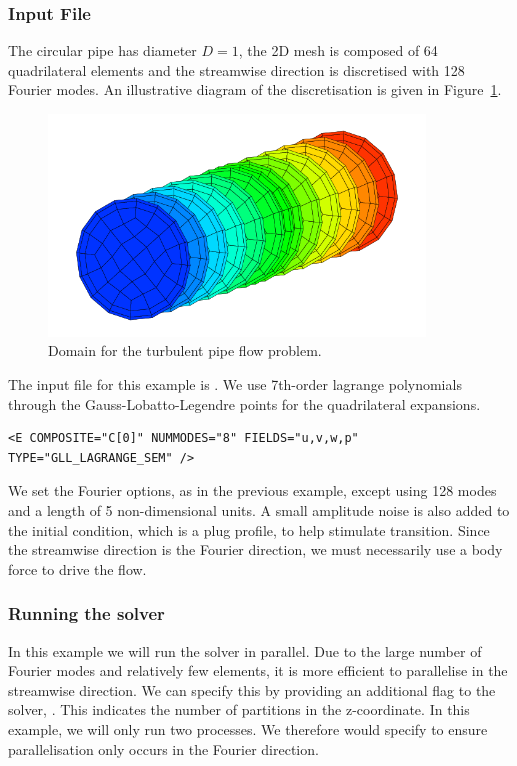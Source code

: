 \subsubsection{Input File}
The circular pipe has diameter $D=1$, the 2D mesh is composed of 64
quadrilateral elements and the streamwise direction is discretised with 128
Fourier modes. An illustrative diagram of the discretisation is given in
Figure~\ref{f:incns:turbpipemesh}.

\begin{figure}
\begin{center}
\includegraphics[width=10cm]{img/PipeDomain.png}
\caption{Domain for the turbulent pipe flow problem.}
\label{f:incns:turbpipemesh}
\end{center}
\end{figure}

The input file for this example is . We use 7th-order
lagrange polynomials through the Gauss-Lobatto-Legendre points for the
quadrilateral expansions.
\begin{lstlisting}[style=XMLStyle]
<E COMPOSITE="C[0]" NUMMODES="8" FIELDS="u,v,w,p" TYPE="GLL_LAGRANGE_SEM" />
\end{lstlisting}
We set the Fourier options, as in the previous example, except using 128
modes and a length of 5 non-dimensional units. A small amplitude noise is also
added to the initial condition, which is a plug profile, to help stimulate
transition. Since the streamwise direction is the Fourier direction, we must
necessarily use a body force to drive the flow.

\subsubsection{Running the solver}
In this example we will run the solver in parallel. Due to the large number of
Fourier modes and relatively few elements, it is more efficient to parallelise
in the streamwise direction. We can specify this by providing an additional flag
to the solver, . This indicates the number of partitions in the
z-coordinate. In this example, we will only run two processes. We therefore
would specify  to ensure parallelisation only occurs in the
Fourier direction.

